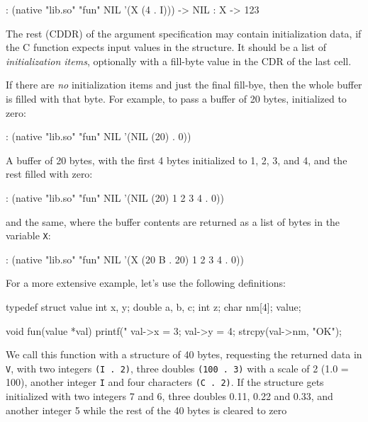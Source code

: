 \begin{wideverbatim}
: (native "lib.so" "fun" NIL '(X (4 . I)))
-> NIL
: X
-> 123
\end{wideverbatim}

The rest (CDDR) of the argument specification may contain initialization
data, if the C function expects input values in the structure. It should
be a list of \emph{initialization items}, optionally
with a fill-byte value in the CDR of the last cell.

If there are \emph{no} initialization items and just the final fill-bye,
then the whole buffer is filled with that byte. For example, to pass a
buffer of 20 bytes, initialized to zero:

\begin{wideverbatim}
: (native "lib.so" "fun" NIL '(NIL (20) . 0))
\end{wideverbatim}

A buffer of 20 bytes, with the first 4 bytes initialized to 1, 2, 3, and
4, and the rest filled with zero:

\begin{wideverbatim}
: (native "lib.so" "fun" NIL '(NIL (20) 1 2 3 4 . 0))
\end{wideverbatim}

and the same, where the buffer contents are returned as a list of bytes
in the variable \texttt{X}:

\begin{wideverbatim}
: (native "lib.so" "fun" NIL '(X (20 B . 20) 1 2 3 4 . 0))
\end{wideverbatim}

For a more extensive example, let's use the following definitions:

\begin{wideverbatim}
typedef struct value {
   int x, y;
   double a, b, c;
   int z;
   char nm[4];
} value;

void fun(value *val) {
   printf("%
   val->x = 3;
   val->y = 4;
   strcpy(val->nm, "OK");
}
\end{wideverbatim}

We call this function with a structure of 40 bytes, requesting the
returned data in \texttt{V}, with two integers \texttt{(I . 2)}, three
doubles \texttt{(100 . 3)} with a scale of 2 (1.0 = 100), another
integer \texttt{I} and four characters \texttt{(C . 2)}. If the
structure gets initialized with two integers 7 and 6, three doubles
0.11, 0.22 and 0.33, and another integer 5 while the rest of the 40
bytes is cleared to zero

